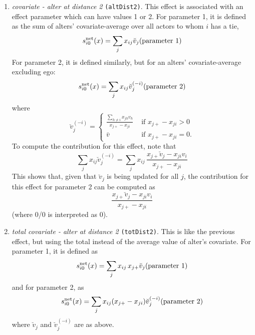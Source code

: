 \documentclass[a4paper,fleqn,11pt]{article}
\newcommand{\+}{\, + \,}
\newcommand{\vit}{\theenumi}
\newcounter{savenumi}
\begin{document}
\begin{enumerate}
\setcounter{enumi}{\value{savenumi}}

\item \emph{covariate - alter at distance 2} \texttt{(altDist2)}.
      This effect is associated with an effect parameter
      which can have values 1 or 2.
      For parameter 1, it is
      defined as the sum of alters' covariate-average over all actors
      to whom $i$ has a tie,
\[
 s^{\rm net}_{i\vit}(x) = \sum_j x_{ij} \breve v_j \hfill
            (\text{parameter 1}) \hfill
\]
      For parameter 2, it is defined similarly,
      but for an alters' covariate-average excluding
      ego:
\[
 s^{\rm net}_{i\vit}(x) = \sum_j x_{ij} \breve v_j^{(-i)} \hfill
                          (\text{parameter 2}) \hfill
\]
      where
\begin{equation}
  \breve v_j^{(-i)} = \left\{\begin{array}{ll} \displaystyle
         \frac{\sum_{h \neq i} x_{jh}v_h}{x_{j+} - x_{ji}}  &
                                       \text{ if } x_{j+} - x_{ji} > 0     \\
         \bar v                               &  \text{ if } x_{j+}- x_{ji} = 0  .
  \end{array}   \right.            \label{alt_av2}
\end{equation}
      To compute the contribution for this effect, note that
\[
 \sum_j x_{ij} \breve v_j^{(-i)} = \sum_j x_{ij} \,
                      \frac{x_{j+} \breve v_j - x_{ji}v_i}{x_{j+}-x_{ji}}
\]
      This shows that, given that $\breve v_j$ is being updated for all $j$,
      the contribution for this effect for parameter 2 can be computed as
      \[
       \frac{x_{j+} \breve v_j - x_{ji}v_i}{x_{j+}-x_{ji}}
      \]
      (where 0/0 is interpreted as 0).


\item \emph{total covariate - alter at distance 2} \texttt{(totDist2)}.
      This is like the previous effect, but using the total
      instead of the average value of alter's covariate.
      For parameter 1, it is  defined as
\[
 s^{\rm net}_{i\vit}(x) = \sum_j x_{ij} \, x_{j+}\breve v_j \hfill
            (\text{parameter 1}) \hfill
\]
      and for parameter 2, as
\[
 s^{\rm net}_{i\vit}(x) = \sum_j x_{ij} (x_{j+} - x_{ji}) \breve v_j^{(-i)} \hfill
                          (\text{parameter 2}) \hfill
\]
      where $\breve v_j$ and $\breve v_j^{(-i)}$ are as above.


\end{enumerate}
\end{document}
